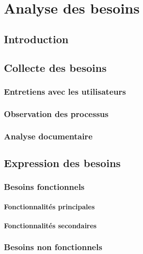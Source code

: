 \chapter{Analyse des besoins}

\section{Introduction}

\section{Collecte des besoins}

\subsection{Entretiens avec les utilisateurs}

\subsection{Observation des processus}

\subsection{Analyse documentaire}

\section{Expression des besoins}

\subsection{Besoins fonctionnels}

\subsubsection{Fonctionnalités principales}

\subsubsection{Fonctionnalités secondaires}

\subsection{Besoins non fonctionnels}

